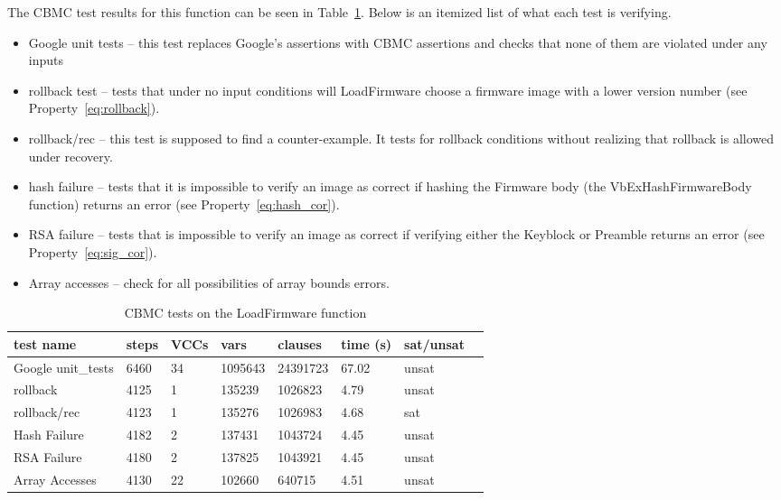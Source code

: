 The CBMC test results for this function can be seen in Table~\ref{ldfw_results}. 
Below is an itemized list of what each test is verifying.

\begin{itemize}
 \item  Google unit tests -- this test replaces Google's assertions with CBMC assertions and checks that none of them are violated under any inputs
 \item  rollback test -- tests that under no input conditions will LoadFirmware choose a firmware image with a lower version number (see Property~\ref{eq:rollback}).
 \item  rollback/rec  -- this test is supposed to find a counter-example. It tests for rollback conditions without realizing that rollback is allowed under recovery. 
 \item  hash failure -- tests that it is impossible to verify an image as correct  if hashing the Firmware body (the VbExHashFirmwareBody function) returns an error (see Property~\ref{eq:hash_cor}).
 \item  RSA failure -- tests that is impossible to verify an image as correct if verifying either the Keyblock or Preamble returns an error (see Property~\ref{eq:sig_cor}).
 \item  Array accesses -- check for all possibilities of array bounds errors.
\end{itemize}

\begin{table}[!htbp]
    \centering
    \caption{CBMC tests on the LoadFirmware function}\label{ldfw_results}
    \begin{tabular}{|l|l|l|l|l|l|l|l|}
        \hline
        test name & steps & VCCs & vars  & clauses & time (s) & sat/unsat  \\ \hline \hline
        Google unit\_tests & 6460 & 34 & 1095643 & 24391723 & 67.02 & unsat \\ \hline
        rollback     & 4125 & 1 & 135239 & 1026823 & 4.79 & unsat \\ \hline
        rollback/rec & 4123 & 1 & 135276 & 1026983 & 4.68 & sat \\ \hline
        Hash Failure & 4182 & 2 & 137431 & 1043724 & 4.45 & unsat \\ \hline
        RSA  Failure & 4180 & 2 & 137825 & 1043921 & 4.45 & unsat \\ \hline
        Array Accesses & 4130 & 22 & 102660 & 640715 & 4.51 & unsat \\ \hline
    \end{tabular}
\end{table}

